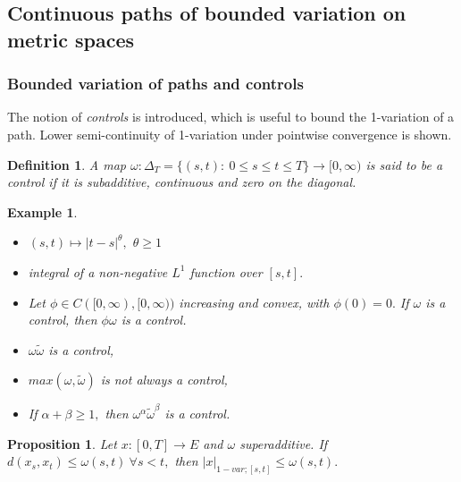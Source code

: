 \documentclass{article}
\newtheorem{definition}{Definition}
\newtheorem{prop}[theorem]{Proposition}
\newtheorem{example}{Example}
\begin{document}
\subsection{Continuous paths of bounded variation on
metric spaces}

\subsubsection{Bounded variation of paths and controls}

The notion of \textit{controls} is introduced, which is useful to bound the 1-variation of a path. Lower semi-continuity of 1-variation under pointwise convergence is shown.

\begin{definition}
    A map $\omega: \Delta_T = \{(s,t):\ 0 \leq s \leq t \leq T \} \rightarrow [0, \infty)$
    is said to be a control if it is subadditive, continuous and zero on the diagonal. 
\end{definition}

\begin{example}
    \begin{itemize}
        \item $(s,t) \mapsto |t - s|^{\theta},$ $\theta \geq 1$
        \item integral of a non-negative $L^1$ function over $[s,t].$
        \item Let $\phi \in C([0,\infty), [0,\infty))$ increasing and convex, with $\phi(0)=0.$ If $\omega$ is a control, then $\phi \omega$ is a control.
        \item $\omega \tilde{\omega}$ is a control,
        \item $max(\omega, \tilde{\omega})$ is not always a control,
        \item If $\alpha + \beta \geq 1,$ then $\omega^{\alpha} \tilde{\omega}^{\beta}$ is a control.
    \end{itemize}
\end{example}

\begin{prop}
    Let $x:[0,T] \rightarrow E$ and $\omega$ superadditive. If $d(x_s, x_t) \leq \omega(s, t)\ \forall s < t,$ then $|x|_{1-var; [s,t]} \leq \omega(s,t).$
\end{prop}
\end{document}
